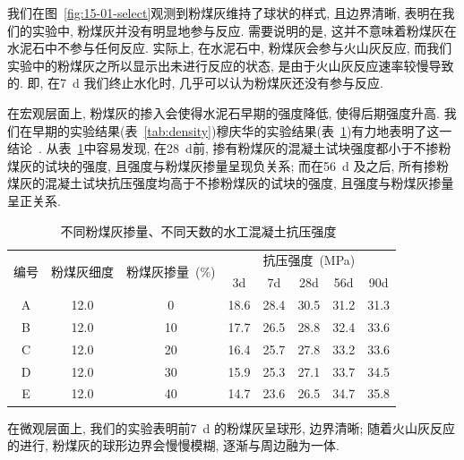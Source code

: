 我们在图~\ref{fig:15-01-select}观测到粉煤灰维持了球状的样式, 且边界清晰, 表明在我们的实验中, 粉煤灰并没有明显地参与反应. 需要说明的是, 这并不意味着粉煤灰在水泥石中不参与任何反应. 实际上, 在水泥石中, 粉煤灰会参与火山灰反应, 而我们实验中的粉煤灰之所以显示出未进行反应的状态, 是由于火山灰反应速率较慢导致的. 即, 在\SI{7}{\day} 我们终止水化时, 几乎可以认为粉煤灰还没有参与反应.

在宏观层面上, 粉煤灰的掺入会使得水泥石早期的强度降低, 使得后期强度升高. 我们在早期的实验结果(表~\ref{tab:density})穆庆华的实验结果(表~\ref{tab:strength_fa})有力地表明了这一结论~\cite{mu_fa}. 从表~\ref{tab:strength_fa}中容易发现, 在\SI{28}{\day}前, 掺有粉煤灰的混凝土试块强度都小于不掺粉煤灰的试块的强度, 且强度与粉煤灰掺量呈现负关系; 而在\SI{56}{\day} 及之后, 所有掺粉煤灰的混凝土试块抗压强度均高于不掺粉煤灰的试块的强度, 且强度与粉煤灰掺量呈正关系.

\begin{table}[!t]
  \centering
  \caption{不同粉煤灰掺量、不同天数的水工混凝土抗压强度~\cite{mu_fa}}
  \begin{tabular}{|c|c|c|ccccc|}
    \hline
    \multirow{2}{*}{编号} & \multirow{2}{*}{粉煤灰细度} & \multirow{2}{*}{粉煤灰掺量~(\unit{\percent})} & \multicolumn{5}{c|}{抗压强度~(\unit{\mega\pascal})}                                                                  \\ \cline{4-8}
                          &                             &                                               & \multicolumn{1}{c|}{3d}   & \multicolumn{1}{c|}{7d}   & \multicolumn{1}{c|}{28d}  & \multicolumn{1}{c|}{56d}  & 90d  \\ \hline
    A                     & 12.0                        & 0                                             & \multicolumn{1}{c|}{18.6} & \multicolumn{1}{c|}{28.4} & \multicolumn{1}{c|}{30.5} & \multicolumn{1}{c|}{31.2} & 31.3 \\ \hline
    B                     & 12.0                        & 10                                            & \multicolumn{1}{c|}{17.7} & \multicolumn{1}{c|}{26.5} & \multicolumn{1}{c|}{28.8} & \multicolumn{1}{c|}{32.4} & 33.6 \\ \hline
    C                     & 12.0                        & 20                                            & \multicolumn{1}{c|}{16.4} & \multicolumn{1}{c|}{25.7} & \multicolumn{1}{c|}{27.8} & \multicolumn{1}{c|}{33.2} & 33.6 \\ \hline
    D                     & 12.0                        & 30                                            & \multicolumn{1}{c|}{15.9} & \multicolumn{1}{c|}{25.3} & \multicolumn{1}{c|}{27.1} & \multicolumn{1}{c|}{33.7} & 34.5 \\ \hline
    E                     & 12.0                        & 40                                            & \multicolumn{1}{c|}{14.7} & \multicolumn{1}{c|}{23.6} & \multicolumn{1}{c|}{26.5} & \multicolumn{1}{c|}{34.7} & 35.8 \\ \hline
  \end{tabular}

  \label{tab:strength_fa}
\end{table}

在微观层面上, 我们的实验表明前\SI{7}{\day} 的粉煤灰呈球形, 边界清晰; 随着火山灰反应的进行, 粉煤灰的球形边界会慢慢模糊, 逐渐与周边融为一体.
